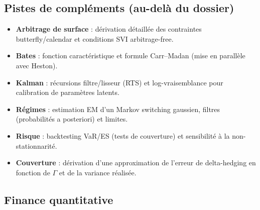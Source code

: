 \documentclass[11pt,a4paper]{article}
\newcommand{\1}{\mathbf{1}}
\begin{document}
\subsection{Pistes de compl\'ements (au-del\`a du dossier)}

\begin{itemize}
  \item \textbf{Arbitrage de surface} : d\'erivation d\'etaill\'ee des contraintes butterfly/calendar et conditions SVI arbitrage-free.
  \item \textbf{Bates} : fonction caract\'eristique et formule Carr--Madan (mise en parall\`ele avec Heston).
  \item \textbf{Kalman} : r\'ecursions filtre/lisseur (RTS) et log-vraisemblance pour calibration de param\`etres latents.
  \item \textbf{R\'egimes} : estimation EM d'un Markov switching gaussien, filtres (probabilit\'es a posteriori) et limites.
  \item \textbf{Risque} : backtesting VaR/ES (tests de couverture) et sensibilit\'e \`a la non-stationnarit\'e.
  \item \textbf{Couverture} : d\'erivation d'une approximation de l'erreur de delta-hedging en fonction de $\Gamma$ et de la variance r\'ealis\'ee.
\end{itemize}

\iffalse %

\subsection{Finance quantitative}
\end{document}
